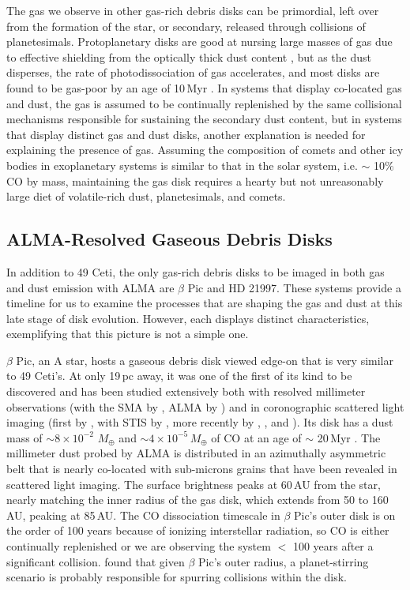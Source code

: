 The gas we observe in other gas-rich debris disks can be primordial, left over from the formation of the star, or secondary, released through collisions of planetesimals. Protoplanetary disks are good at nursing large masses of gas due to effective shielding from the optically thick dust content \citep{Wyat14}, but as the dust disperses, the rate of photodissociation of gas accelerates, and most disks are found to be gas-poor by an age of 10\,Myr \citep{Zuck95}. In systems that display co-located gas and dust, the gas is assumed to be continually replenished by the same collisional mechanisms responsible for sustaining the secondary dust content, but in systems that display distinct gas and dust disks, another explanation is needed for explaining the presence of gas. Assuming the composition of comets and other icy bodies in exoplanetary systems is similar to that in the solar system, i.e. $\sim$ 10$\%$ CO by mass, maintaining the gas disk requires a hearty but not unreasonably large diet of volatile-rich dust, planetesimals, and comets. 

\subsection{ALMA-Resolved Gaseous Debris Disks}

In addition to 49 Ceti, the only gas-rich debris disks to be imaged in both gas and dust emission with ALMA are $\beta$ Pic and HD 21997. These systems provide a timeline for us to examine the processes that are shaping the gas and dust at this late stage of disk evolution. However, each displays distinct characteristics, exemplifying that this picture is not a simple one.

$\beta$ Pic, an A star, hosts a gaseous debris disk viewed edge-on that is very similar to 49 Ceti's. At only 19\,pc away, it was one of the first of its kind to be discovered and has been studied extensively both with resolved millimeter observations (with the SMA by \citealt{Wiln11}, ALMA by \citealt{Dent14}) and in coronographic scattered light imaging (first by \citealt{Smit84}, with STIS by \citealt{Heap00}, more recently by \citealt{Ahmi09}, \citealt{Mill14}, and \citealt{Apai15}). Its disk has a dust mass of $\sim 8\times10^{-2}$ $M_{\oplus}$ and $\sim 4\times10^{-5}$\,$M_{\oplus}$ of CO \citep{Dent14} at an age of $\sim$ 20\,Myr \citep{Bink14}. The millimeter dust probed by ALMA is distributed in an azimuthally asymmetric belt that is nearly co-located with sub-microns grains that have been revealed in scattered light imaging. The surface brightness peaks at 60\,AU from the star, nearly matching the inner radius of the gas disk, which extends from 50 to 160\,AU, peaking at 85\,AU. The CO dissociation timescale in $\beta$ Pic's outer disk is on the order of 100 years because of ionizing interstellar radiation, so CO is either continually replenished or we are observing the system $<$ 100 years after a significant collision. \cite{Moor15} found that given $\beta$ Pic's outer radius, a planet-stirring scenario is probably responsible for spurring collisions within the disk. 


